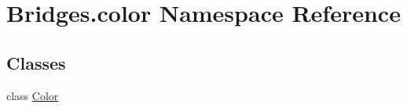 \hypertarget{namespace_bridges_1_1color}{}\section{Bridges.\+color Namespace Reference}
\label{namespace_bridges_1_1color}
\subsection*{Classes}
\begin{DoxyCompactItemize}
\item 
class \mbox{\hyperlink{class_bridges_1_1color_1_1_color}{Color}}
\end{DoxyCompactItemize}
